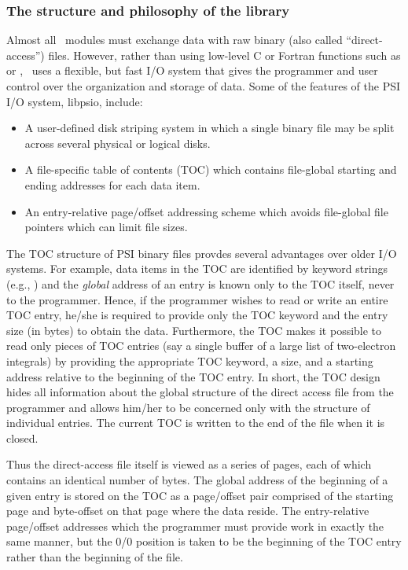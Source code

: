 %
%
%

\subsubsection{The structure and philosophy of the library}

Almost all \PSIthree\ modules must exchange data with raw binary (also
called ``direct-access'') files.  However, rather than using low-level
C or Fortran functions such as  or ,
\PSIthree\ uses a flexible, but fast I/O system that gives the
programmer and user control over the organization and storage of data.
Some of the features of the PSI I/O system, libpsio, include:
\begin{itemize}
\item A user-defined disk striping system in which a single binary
file may be split across several physical or logical disks.
\item A file-specific table of contents (TOC) which contains
file-global starting and ending addresses for each data item.
\item An entry-relative page/offset addressing scheme which avoids
file-global file pointers which can limit file sizes.
\end{itemize}

The TOC structure of PSI binary files provdes several advantages over
older I/O systems.  For example, data items in the TOC are identified
by keyword strings (e.g., ) and the
{\em global} address of an entry is known only to the TOC itself,
never to the programmer. Hence, if the programmer wishes to read or
write an entire TOC entry, he/she is required to provide only the TOC
keyword and the entry size (in bytes) to obtain the data.
Furthermore, the TOC makes it possible to read only pieces of TOC
entries (say a single buffer of a large list of two-electron
integrals) by providing the appropriate TOC keyword, a size, and a
starting address relative to the beginning of the TOC entry. In short,
the TOC design hides all information about the global structure of the
direct access file from the programmer and allows him/her to be
concerned only with the structure of individual entries. The current
TOC is written to the end of the file when it is closed.

Thus the direct-access file itself is viewed as a series of pages,
each of which contains an identical number of bytes. The global
address of the beginning of a given entry is stored on the TOC as a
page/offset pair comprised of the starting page and byte-offset on
that page where the data reside. The entry-relative page/offset
addresses which the programmer must provide work in exactly the same
manner, but the 0/0 position is taken to be the beginning of the TOC
entry rather than the beginning of the file.

